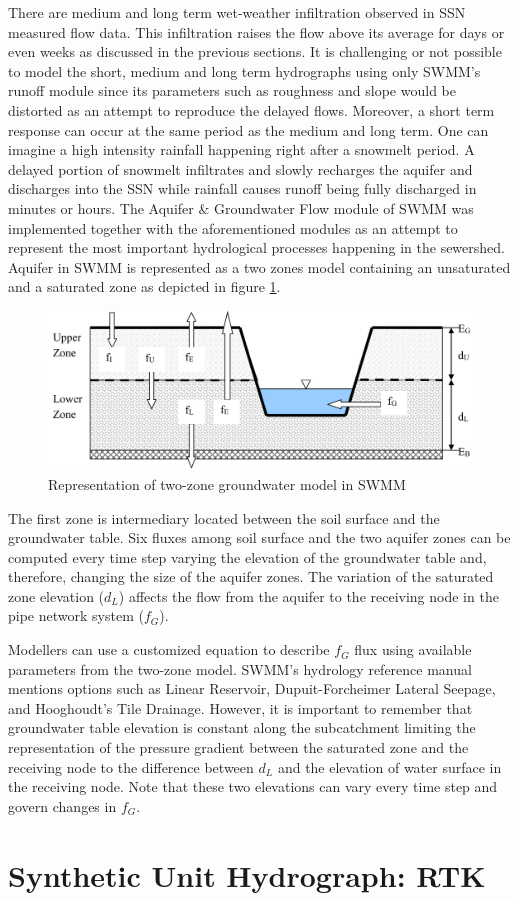 There are medium and long term wet-weather infiltration observed in \acf{SSN} measured flow data. This infiltration raises the flow above its average for days or even weeks as discussed in the previous sections. It is challenging or not possible to model the short, medium and long term hydrographs using only SWMM's runoff module since its parameters such as roughness and slope would be distorted as an attempt to reproduce the delayed flows. Moreover, a short term response can occur at the same period as the medium and long term. One can imagine a high intensity rainfall happening right after a snowmelt period. A delayed portion of snowmelt infiltrates and slowly recharges the aquifer and discharges into the \ac{SSN} while rainfall causes runoff being fully discharged in minutes or hours. The Aquifer \& Groundwater Flow module of SWMM was implemented together with the aforementioned modules as an attempt to represent the most important hydrological processes happening in the sewershed. 
Aquifer in SWMM is represented as a two zones model containing an unsaturated and a saturated zone as depicted in figure \ref{fig:gwtwozoneslit}. 

\begin{figure}[h]
    \centering
	\includegraphics[scale=0.45]{figures/gwtwozoneslit.png}
	\caption{Representation of two-zone groundwater model in SWMM \cite{Rossman2016}}
	\label{fig:gwtwozoneslit}
\end{figure}

The first zone is intermediary located between the soil surface and the groundwater table. Six fluxes among soil surface and the two aquifer zones can be computed every time step varying the elevation of the groundwater table and, therefore, changing the size of the aquifer zones. The variation of the saturated zone elevation ($d_L$) affects the flow from the aquifer to the receiving node in the pipe network system ($f_G$). 

Modellers can use a customized equation to describe $f_G$ flux using available parameters from the two-zone model. SWMM's hydrology reference manual \cite{Rossman2016} mentions options such as Linear Reservoir, Dupuit-Forcheimer Lateral Seepage, and Hooghoudt's Tile Drainage. However, it is important to remember that groundwater table elevation is constant along the subcatchment limiting the representation of the pressure gradient between the saturated zone and the receiving node to the difference between $d_L$ and the elevation of water surface in the receiving node. Note that these two elevations can vary every time step and govern changes in $f_G$.


\section{Synthetic Unit Hydrograph: RTK}





